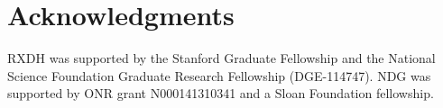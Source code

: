 \documentclass[10pt,letterpaper]{article}
\begin{document}
\section{\bf Acknowledgments}
\small
RXDH was supported by the Stanford Graduate Fellowship and the National Science Foundation Graduate Research Fellowship (DGE-114747). NDG was supported by ONR grant N000141310341 and a Sloan Foundation fellowship.


\setlength{\bibleftmargin}{.125in}
\setlength{\bibindent}{-\bibleftmargin}


\end{document}
